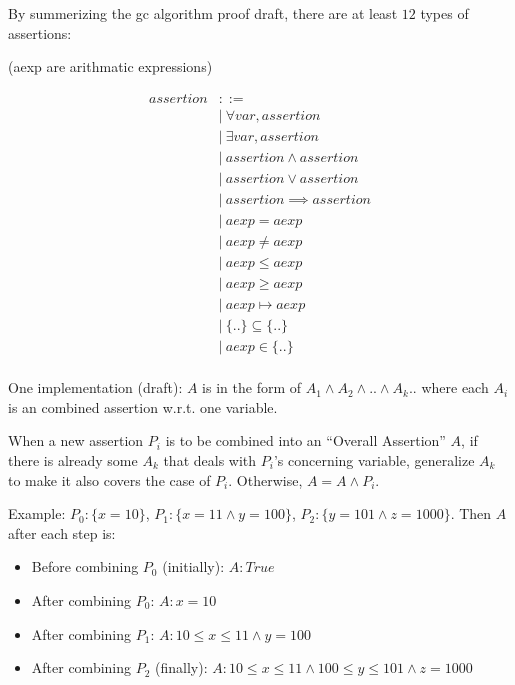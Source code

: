 \documentclass[12pt, fleqn]{article}
\begin{document}
\bigskip

By summerizing the gc algorithm proof draft, there are at least $12$
types of assertions:

(aexp are arithmatic expressions)

\begin{equation*}
\begin{aligned}
assertion &::=\\
&| \ \forall var, assertion\\
&| \ \exists var, assertion\\
&| \ assertion \land assertion\\
&| \ assertion \lor assertion\\
&| \ assertion \implies assertion\\
&| \ aexp = aexp\\
&| \ aexp \neq aexp\\
&| \ aexp \le aexp\\
&| \ aexp \ge aexp\\
&| \ aexp \mapsto aexp\\
&| \ \{ .. \} \subseteq \{ .. \}\\
&| \ aexp \in \{ .. \}\\
\end{aligned}
\end{equation*}

One implementation (draft): $A$ is in the form of $A_1 \land A_2 \land
.. \land A_k ..$ where each $A_i$ is an combined assertion w.r.t. one
variable.

When a new assertion $P_i$ is to be combined into an ``Overall
Assertion'' $A$, if there is already some $A_k$ that deals with
$P_i$'s concerning variable, generalize $A_k$ to make it also covers
the case of $P_i$. Otherwise, $A = A \land P_i$.

Example: $P_0: \{ x = 10 \}$, $P_1: \{ x = 11 \land y = 100\}$, $P_2:
\{ y = 101 \land z = 1000 \}$. Then $A$ after each step is:

\begin{itemize}
\item Before combining $P_0$ (initially): $A: True$
\item After combining $P_0$: $A: x = 10$
\item After combining $P_1$: $A: 10 \le x \le 11 \land y = 100$
\item After combining $P_2$ (finally): $A: 10 \le x \le 11 \land 100 \le y \le 101 \land z = 1000 $
\end{itemize}
\end{document}
